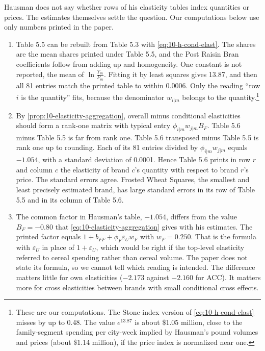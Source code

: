 \begin{remark}\label{rem:10-orientation}
Hausman does not say whether rows of his elasticity tables index quantities or prices. The estimates
themselves settle the question. Our computations below use only numbers printed in the paper.
\begin{enumerate}[label=(\alph*)]
\item Table 5.5 can be rebuilt from Table 5.3 with \eqref{eq:10-h-cond-elast}. The shares are the mean shares
printed under Table 5.5, and the Post Raisin Bran coefficients follow from adding up and homogeneity. One
constant is not reported, the mean of $\ln\frac{Y_m}{P_m}$. Fitting it by least squares gives 13.87, and
then all 81 entries match the printed table to within 0.0006. Only the reading ``row $i$ is the quantity''
fits, because the denominator $w_{i|m}$ belongs to the quantity.\footnote{These are our computations. The Stone-index
version of \eqref{eq:10-h-cond-elast} misses by up to 0.48. The value $e^{13.87}$ is about \$1.05 million,
close to the family-segment spending per city-week implied by Hausman's pound volumes and prices (about
\$1.14 million), if the price index is normalized near one.}
\item By \cref{prop:10-elasticity-aggregation}, overall minus conditional elasticities should form a rank-one
matrix with typical entry $\phi_{i|m}w_{j|m}B_F$. Table 5.6 minus Table 5.5 is far from rank one. Table 5.6
transposed minus Table 5.5 is rank one up to rounding. Each of its 81 entries divided by
$\phi_{i|m}w_{j|m}$ equals $-1.054$, with a standard deviation of 0.0001. Hence Table 5.6 prints in row $r$
and column $c$ the elasticity of brand $c$'s quantity with respect to brand $r$'s price. The standard errors
agree. Frosted Wheat Squares, the smallest and least precisely estimated brand, has large standard errors in
its row of Table 5.5 and in its column of Table 5.6.
\item The common factor in Hausman's table, $-1.054$, differs from the value $B_F = -0.80$ that
\eqref{eq:10-elasticity-aggregation} gives with his estimates. The printed factor equals
$1 + b_{FF} + \phi_F\varepsilon_Uw_F$ with $w_F = 0.250$. That is the formula with $\varepsilon_U$ in place of
$1 + \varepsilon_U$, which would be right if the top-level elasticity referred to cereal spending rather than
cereal volume. The paper does not state its formula, so we cannot tell which reading is intended. The
difference matters little for own elasticities ($-2.173$ against $-2.160$ for ACC). It matters more for cross
elasticities between brands with small conditional cross effects.
\end{enumerate}
\end{remark}

